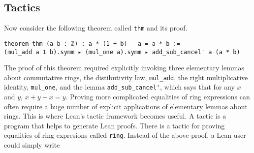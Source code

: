 \documentclass[12pt]{article} %
\theoremstyle{definition}
\theoremstyle{definition}
\theoremstyle{definition}
\theoremstyle{definition}
\begin{document}



\subsection{Tactics}

Now consider the following theorem called \lstinline{thm} and its proof.

\begin{lstlisting}
theorem thm (a b : ℤ) : a * (1 + b) - a = a * b :=
(mul_add a 1 b).symm ▸ (mul_one a).symm ▸ add_sub_cancel' a (a * b)
\end{lstlisting}

The proof of this theorem required explicitly invoking three elementary lemmas about commutative
rings, the distibutivity law, \lstinline{mul_add}, the right multiplicative identity, \newline
\lstinline{mul_one}, and the lemma \lstinline{add_sub_cancel'},
which says that for any $x$ and $y$, $x + y - x = y$.
Proving more complicated equalities of ring expressions can often require a huge
number of explicit applications of elementary lemmas about rings. This is where Lean's
tactic framework becomes useful. A tactic is a program that helps to generate Lean proofs. There is
a tactic for proving equalities of ring expresions called \lstinline{ring}. Instead
of the above proof, a Lean user could simply write
\end{document}
